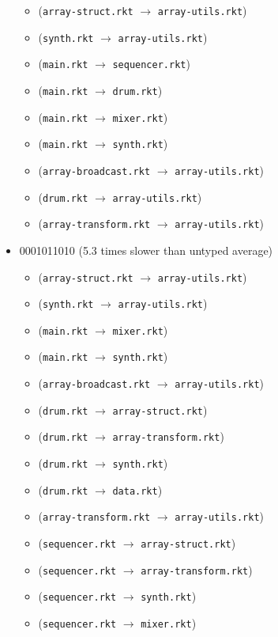 \documentclass{article}
\newcommand{\mono}[1]{\texttt{#1}}
\begin{document}
\begin{itemize}
  \begin{itemize}
  \item (\mono{array-struct.rkt} $\rightarrow$ \mono{array-utils.rkt})
  \item (\mono{synth.rkt} $\rightarrow$ \mono{array-utils.rkt})
  \item (\mono{main.rkt} $\rightarrow$ \mono{sequencer.rkt})
  \item (\mono{main.rkt} $\rightarrow$ \mono{drum.rkt})
  \item (\mono{main.rkt} $\rightarrow$ \mono{mixer.rkt})
  \item (\mono{main.rkt} $\rightarrow$ \mono{synth.rkt})
  \item (\mono{array-broadcast.rkt} $\rightarrow$ \mono{array-utils.rkt})
  \item (\mono{drum.rkt} $\rightarrow$ \mono{array-utils.rkt})
  \item (\mono{array-transform.rkt} $\rightarrow$ \mono{array-utils.rkt})
  \end{itemize}
\item 0001011010 (5.3 times slower than untyped average)
  \begin{itemize}
  \item (\mono{array-struct.rkt} $\rightarrow$ \mono{array-utils.rkt})
  \item (\mono{synth.rkt} $\rightarrow$ \mono{array-utils.rkt})
  \item (\mono{main.rkt} $\rightarrow$ \mono{mixer.rkt})
  \item (\mono{main.rkt} $\rightarrow$ \mono{synth.rkt})
  \item (\mono{array-broadcast.rkt} $\rightarrow$ \mono{array-utils.rkt})
  \item (\mono{drum.rkt} $\rightarrow$ \mono{array-struct.rkt})
  \item (\mono{drum.rkt} $\rightarrow$ \mono{array-transform.rkt})
  \item (\mono{drum.rkt} $\rightarrow$ \mono{synth.rkt})
  \item (\mono{drum.rkt} $\rightarrow$ \mono{data.rkt})
  \item (\mono{array-transform.rkt} $\rightarrow$ \mono{array-utils.rkt})
  \item (\mono{sequencer.rkt} $\rightarrow$ \mono{array-struct.rkt})
  \item (\mono{sequencer.rkt} $\rightarrow$ \mono{array-transform.rkt})
  \item (\mono{sequencer.rkt} $\rightarrow$ \mono{synth.rkt})
  \item (\mono{sequencer.rkt} $\rightarrow$ \mono{mixer.rkt})

\end{itemize}
\end{itemize}
\end{document}
